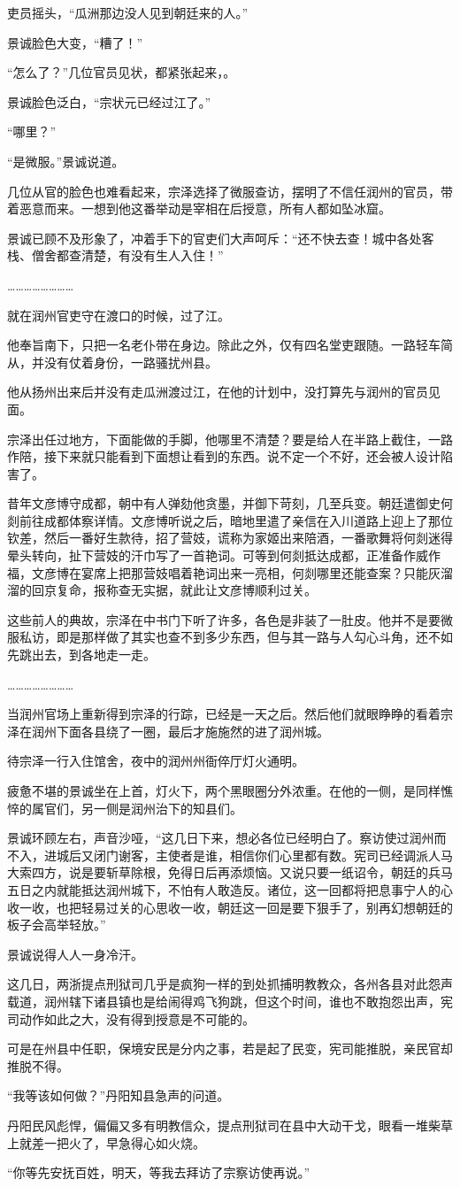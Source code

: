 吏员摇头，“瓜洲那边没人见到朝廷来的人。”

景诚脸色大变，“糟了！”

“怎么了？”几位官员见状，都紧张起来，。

景诚脸色泛白，“宗状元已经过江了。”

“哪里？”

“是微服。”景诚说道。

几位从官的脸色也难看起来，宗泽选择了微服查访，摆明了不信任润州的官员，带着恶意而来。一想到他这番举动是宰相在后授意，所有人都如坠冰窟。

景诚已顾不及形象了，冲着手下的官吏们大声呵斥：“还不快去查！城中各处客栈、僧舍都查清楚，有没有生人入住！”

……………………

就在润州官吏守在渡口的时候，过了江。

他奉旨南下，只把一名老仆带在身边。除此之外，仅有四名堂吏跟随。一路轻车简从，并没有仗着身份，一路骚扰州县。

他从扬州出来后并没有走瓜洲渡过江，在他的计划中，没打算先与润州的官员见面。

宗泽出任过地方，下面能做的手脚，他哪里不清楚？要是给人在半路上截住，一路作陪，接下来就只能看到下面想让看到的东西。说不定一个不好，还会被人设计陷害了。

昔年文彦博守成都，朝中有人弹劾他贪墨，并御下苛刻，几至兵变。朝廷遣御史何剡前往成都体察详情。文彦博听说之后，暗地里遣了亲信在入川道路上迎上了那位钦差，然后一番好生款待，招了营妓，谎称为家姬出来陪酒，一番歌舞将何剡迷得晕头转向，扯下营妓的汗巾写了一首艳词。可等到何剡抵达成都，正准备作威作福，文彦博在宴席上把那营妓唱着艳词出来一亮相，何剡哪里还能查案？只能灰溜溜的回京复命，报称查无实据，就此让文彦博顺利过关。

这些前人的典故，宗泽在中书门下听了许多，各色是非装了一肚皮。他并不是要微服私访，即是那样做了其实也查不到多少东西，但与其一路与人勾心斗角，还不如先跳出去，到各地走一走。

……………………

当润州官场上重新得到宗泽的行踪，已经是一天之后。然后他们就眼睁睁的看着宗泽在润州下面各县绕了一圈，最后才施施然的进了润州城。

待宗泽一行入住馆舍，夜中的润州州衙倅厅灯火通明。

疲惫不堪的景诚坐在上首，灯火下，两个黑眼圈分外浓重。在他的一侧，是同样憔悴的属官们，另一侧是润州治下的知县们。

景诚环顾左右，声音沙哑，“这几日下来，想必各位已经明白了。察访使过润州而不入，进城后又闭门谢客，主使者是谁，相信你们心里都有数。宪司已经调派人马大索四方，说是要斩草除根，免得日后再添烦恼。又说只要一纸诏令，朝廷的兵马五日之内就能抵达润州城下，不怕有人敢造反。诸位，这一回都将把息事宁人的心收一收，也把轻易过关的心思收一收，朝廷这一回是要下狠手了，别再幻想朝廷的板子会高举轻放。”

景诚说得人人一身冷汗。

这几日，两浙提点刑狱司几乎是疯狗一样的到处抓捕明教教众，各州各县对此怨声载道，润州辖下诸县镇也是给闹得鸡飞狗跳，但这个时间，谁也不敢抱怨出声，宪司动作如此之大，没有得到授意是不可能的。

可是在州县中任职，保境安民是分内之事，若是起了民变，宪司能推脱，亲民官却推脱不得。

“我等该如何做？”丹阳知县急声的问道。

丹阳民风彪悍，偏偏又多有明教信众，提点刑狱司在县中大动干戈，眼看一堆柴草上就差一把火了，早急得心如火烧。

“你等先安抚百姓，明天，等我去拜访了宗察访使再说。”
